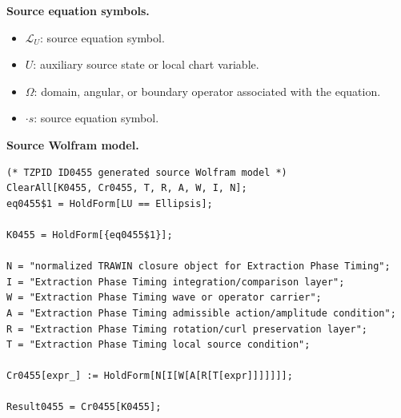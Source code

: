 \begin{minipage}[t]{0.49\linewidth}
\begingroup
\small
\raggedright
\textbf{Source equation symbols.}\par
\begin{itemize}[leftmargin=1.35em,itemsep=1pt,topsep=1pt,parsep=0pt]
    \item $\mathcal{L}_{U}$: source equation symbol.
    \item $U$: auxiliary source state or local chart variable.
    \item $\Omega$: domain, angular, or boundary operator associated with the equation.
    \item $\cdot s$: source equation symbol.
\end{itemize}
\endgroup
\end{minipage}\hfill
\begin{minipage}[t]{0.47\linewidth}
\begingroup
\scriptsize
\raggedright
\textbf{Source Wolfram model.}\par
\begin{Verbatim}[fontsize=\tiny,breaklines=true,breakanywhere=true]
(* TZPID ID0455 generated source Wolfram model *)
ClearAll[K0455, Cr0455, T, R, A, W, I, N];
eq0455$1 = HoldForm[LU == Ellipsis];

K0455 = HoldForm[{eq0455$1}];

N = "normalized TRAWIN closure object for Extraction Phase Timing";
I = "Extraction Phase Timing integration/comparison layer";
W = "Extraction Phase Timing wave or operator carrier";
A = "Extraction Phase Timing admissible action/amplitude condition";
R = "Extraction Phase Timing rotation/curl preservation layer";
T = "Extraction Phase Timing local source condition";

Cr0455[expr_] := HoldForm[N[I[W[A[R[T[expr]]]]]]];

Result0455 = Cr0455[K0455];
\end{Verbatim}
\endgroup
\end{minipage}

